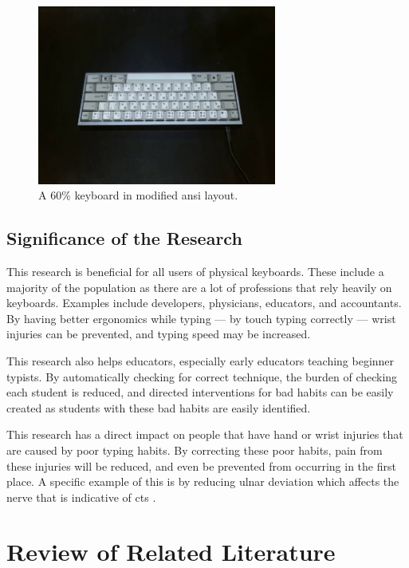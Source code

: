 \documentclass{report}
\begin{document}
\begin{figure}[H]
	\centering
	\includegraphics[width=0.7\textwidth]{60.png}
	\caption{A 60\% keyboard in modified \ac{ansi} layout.}
	\label{fig:60}
	\centering
\end{figure}


\section{Significance of the Research}
This research is beneficial for all users of physical keyboards. These include a
majority of the population as there are a lot of professions that rely heavily
on keyboards. Examples include developers, physicians, educators, and
accountants. By having better ergonomics while typing --- by touch typing
correctly --- wrist injuries can be prevented, and typing speed may be
increased.

This research also helps educators, especially early educators teaching beginner
typists. By automatically checking for correct technique, the burden of checking
each student is reduced, and directed interventions for bad habits can be easily
created as students with these bad habits are easily identified.

This research has a direct impact on people that have hand or wrist injuries
that are caused by poor typing habits. By correcting these poor habits, pain
from these injuries will be reduced, and even be prevented from occurring in the
first place. A specific example of this is by reducing ulnar deviation which
affects the nerve that is indicative of \ac{cts} \parencite{toosi2015}.

\chapter{Review of Related Literature}
\end{document}
